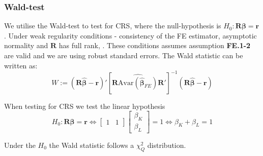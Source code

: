 

\subsubsection*{Wald-test}
We utilise the Wald-test to test for CRS, where the null-hypothesis is $H_0: \mathbf{R}\boldsymbol{\beta}=\mathbf{r}$. Under weak regularity conditions - consistency of the FE estimator, asymptotic normality and $\mathbf{R}$ has full rank, . These conditions assumes assumption \textbf{FE.1-2} are valid and we are using robust standard errors. The Wald statistic can be written as:
\begin{equation*}
    W:=(\mathbf{R}{\boldsymbol{\hat\beta}}-\mathbf{r})'
    [\mathbf{R}\widehat{\text{Avar}({\boldsymbol{\hat{\beta}}}_{FE})}\mathbf{R}']^{-1}
    (\mathbf{R} \boldsymbol{\hat{\beta}}-\mathbf{r})
\end{equation*}

When testing for CRS we test the linear hypothesis
\begin{equation*}
  H_0: \mathbf{R}\boldsymbol{\beta}=\mathbf{r} \Leftrightarrow
\begin{bmatrix} 1&1 \end{bmatrix} \begin{bmatrix} \beta_K \\ \beta_L \end{bmatrix} =1
\Leftrightarrow \beta_K+\beta_L=1  
\end{equation*}


Under the $H_0$ the Wald statistic follows a $\chi^2_Q$ distribution.

